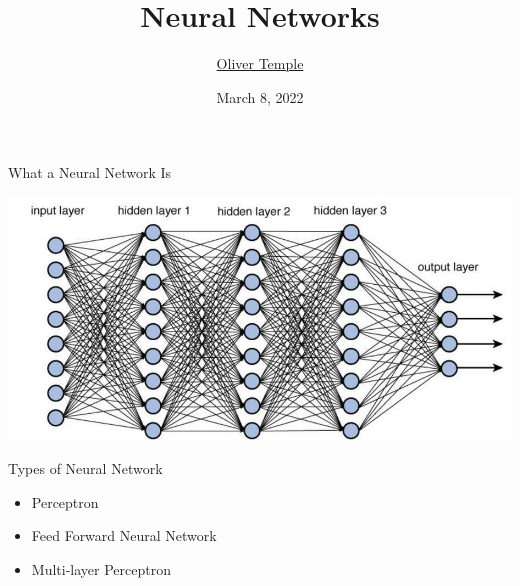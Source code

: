 \documentclass{beamer}
\title{Neural Networks}
\author{\href{mailto:olivertemple@exe-coll.ac.uk}{Oliver Temple}}
\date{March 8, 2022}
\begin{document}
\maketitle



\begin{frame}{What a Neural Network Is}
    \begin{center}
        \includegraphics[width=\textwidth]{images/neural_network}
    \end{center}
\end{frame}



\begin{frame}{Types of Neural Network}
    \begin{itemize}
        \item Perceptron
        \item Feed Forward Neural Network
        \item Multi-layer Perceptron
    \end{itemize}
\end{frame}
\end{document}
